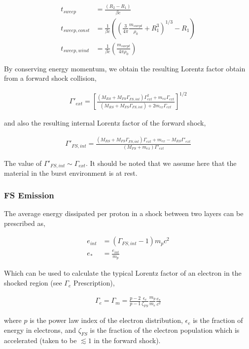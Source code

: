 \documentclass[linenumbers,twocolumn]{aastex631}
\begin{document}
\begin{align}
	t_{sweep} &= \frac{ (R_2 - R_1) }{\beta c}\\
	t_{sweep,const} &= \frac{1}{\beta c} \left(\left(\frac{3}{4\pi} \frac{m_{swept}}{\rho_0} + R_1^3\right)^{1/3} - R_1\right)\\
	t_{sweep,wind} &= \frac{1}{\beta c} \left(\frac{m_{swept}}{4 \pi \rho_0}\right)
\end{align}

By conserving energy momentum, we obtain the resulting Lorentz factor obtain from a forward shock collision,

\begin{align}\label{eq: gamma_ext}
\Gamma'_{ext} = \left[\frac{(M_{RS} + M_{FS}\Gamma_{FS,int})\Gamma_{ext}^2 + m_{ex}\Gamma_{ext}}{(M_{RS} + M_{FS}\Gamma_{FS,int}) + 2m_{ex}\Gamma_{ext}}\right]^{1/2}
\end{align}

and also the resulting internal Lorentz factor of the forward shock,

\begin{align}
\Gamma'_{FS,int} = \frac{(M_{RS} + M_{FS}\Gamma_{FS,int})\Gamma_{ext} + m_{ex} - M_{RS} \Gamma'_{ext}}{(M_{FS} + m_{ex})\Gamma'_{ext}}
\end{align}

The value of $\Gamma'_{FS,int} \sim \Gamma_{ext}$. It should be noted that we assume here that the material in the burst environment is at rest.

\subsubsection{FS Emission}

The average energy dissipated per proton in a shock between two layers can be prescribed as, 

\begin{align}
e_{int} &= (\Gamma_{FS,int} - 1)m_pc^2\\
e_* &= \frac{e_{int}}{m_p}
\end{align}

Which can be used to calculate the typical Lorentz factor of an electron in the shocked region (see $\Gamma_e$ Prescription),

\begin{align} \label{eq: gamma_e}
	\Gamma_e = \Gamma_m = \frac{p-2}{p-1} \frac{\epsilon_e}{\zeta_{FS}} \frac{m_p}{m_e} \frac{e_*}{c^2}
\end{align}


where $p$ is the power law index of the electron distribution, $\epsilon_e$ is the fraction of energy in electrons, and $\zeta_{FS}$ is the fraction of the electron population which is accelerated (taken to be $\lesssim 1$ in the forward shock). 
\end{document}
